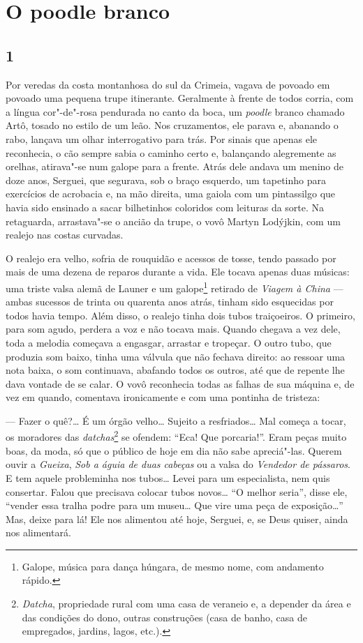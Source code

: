 \chapter{O poodle branco} \label{part10}


\section{1}

\noindent{}Por veredas da costa montanhosa do sul da Crimeia, vagava de povoado em
povoado uma pequena trupe itinerante. Geralmente à frente de todos
corria, com a língua cor"-de"-rosa pendurada no canto da boca, um
\emph{poodle} branco chamado Artô, tosado no estilo de um leão. Nos
cruzamentos, ele parava e, abanando o rabo, lançava um olhar
interrogativo para trás. Por sinais que apenas ele reconhecia, o cão
sempre sabia o caminho certo e, balançando alegremente as orelhas,
atirava"-se num galope para a frente. Atrás dele andava um menino de doze
anos, Serguei, que segurava, sob o braço esquerdo, um tapetinho para
exercícios de acrobacia e, na mão direita, uma gaiola com um pintassilgo
que havia sido ensinado a sacar bilhetinhos coloridos com leituras da
sorte. Na retaguarda, arrastava"-se o ancião da trupe, o vovô Martyn
Lodýjkin, com um realejo nas costas curvadas.

O realejo era velho, sofria de rouquidão e acessos de tosse, tendo
passado por mais de uma dezena de reparos durante a vida. Ele tocava
apenas duas músicas: uma triste valsa alemã de Launer e um
galope\footnote{Galope, música para dança húngara, de mesmo nome, com
  andamento rápido.} retirado de \emph{Viagem à China} --- ambas
sucessos de trinta ou quarenta anos atrás, tinham sido esquecidas por
todos havia tempo. Além disso, o realejo tinha dois tubos traiçoeiros. O
primeiro, para som agudo, perdera a voz e não tocava mais. Quando
chegava a vez dele, toda a melodia começava a engasgar, arrastar e
tropeçar. O outro tubo, que produzia som baixo, tinha uma válvula que
não fechava direito: ao ressoar uma nota baixa, o som continuava,
abafando todos os outros, até que de repente lhe dava vontade de se
calar. O vovô reconhecia todas as falhas de sua máquina e, de vez em
quando, comentava ironicamente e com uma pontinha de tristeza:

--- Fazer o quê?\ldots{} É um órgão velho\ldots{} Sujeito a resfriados\ldots{} Mal
começa a tocar, os moradores das \emph{datchas}\footnote{\emph{Datcha},
  propriedade rural com uma casa de veraneio e, a depender da área e das
  condições do dono, outras construções (casa de banho, casa de
  empregados, jardins, lagos, etc.).} se ofendem: ``Eca! Que
porcaria!''. Eram peças muito boas, da moda, só que o público de hoje em
dia não sabe apreciá"-las. Querem ouvir a \emph{Gueixa}, \emph{Sob a
águia de duas cabeças} ou a valsa do \emph{Vendedor de pássaros}. E tem
aquele probleminha nos tubos\ldots{} Levei para um especialista, nem quis
consertar. Falou que precisava colocar tubos novos\ldots{} ``O melhor seria'',
disse ele, ``vender essa tralha podre para um museu\ldots{} Que vire uma peça
de exposição\ldots{}'' Mas, deixe para lá! Ele nos alimentou até hoje,
Serguei, e, se Deus quiser, ainda nos alimentará.

